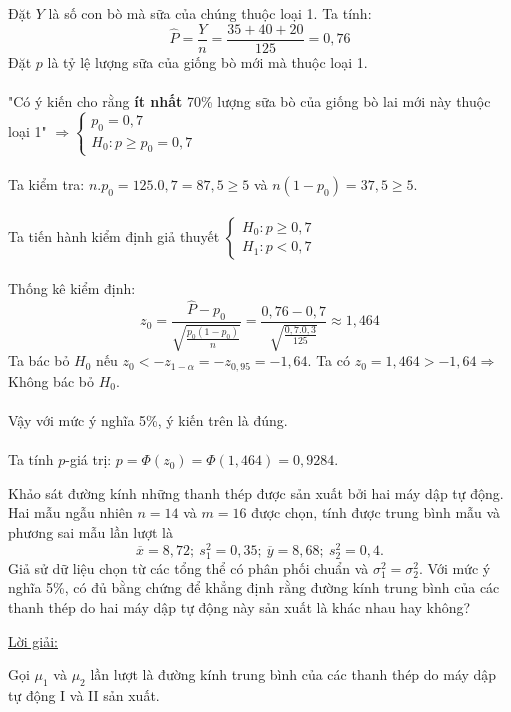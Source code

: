\documentclass[10pt, a4paper]{article}
\begin{document}
Đặt $Y$ là số con bò mà sữa của chúng thuộc loại 1. Ta tính: $$\widehat P=\frac{Y}{n}=\frac{35+40+20}{125}=0,76$$
Đặt $p$ là tỷ lệ lượng sữa của giống bò mới mà thuộc loại 1.\\\\
"Có ý kiến cho rằng \textbf{ít nhất} 70\% lượng sữa bò của giống bò lai mới này thuộc loại 1" $\Rightarrow\begin{cases}
	p_0=0,7\\
	H_0:p\ge p_0=0,7
\end{cases}$\\\\
Ta kiểm tra: $n.p_0=125.0,7=87,5\ge5$ và $n(1-p_0)=37,5\ge5$.\\\\
Ta tiến hành kiểm định giả thuyết $\begin{cases}
	H_0:p\ge0,7\\
	H_1:p<0,7
\end{cases}$\\\\
Thống kê kiểm định: $$z_0=\frac{\widehat P-p_0}{\sqrt{\frac{p_0(1-p_0)}{n}}}=\frac{0,76-0,7}{\sqrt{\frac{0,7.0,3}{125}}}\approx1,464$$
Ta bác bỏ $H_0$ nếu $z_0<-z_{1-\alpha}=-z_{0,95}=-1,64$. Ta có $z_0=1,464>-1,64\Rightarrow$ Không bác bỏ $H_0$.\\\\
Vậy với mức ý nghĩa 5\%, ý kiến trên là đúng.\\\\
Ta tính $p$-giá trị: $p=\Phi(z_0)=\Phi(1,464)=0,9284$.
\vspace{3mm}
\begin{tcolorbox}[enhanced,colback=blue!5!white,colframe=blue!75!black,sharp corners=all,shadow={0mm}{0mm}{-1.5mm}%
{fill=blue!75!red,opacity=0.3},title=\textbf{Bài 2}]
Khảo sát đường kính những thanh thép được sản xuất bởi hai máy dập tự động. Hai mẫu ngẫu nhiên $n=14$ và $m=16$ được chọn, tính được trung bình mẫu và phương sai mẫu lần lượt là $$\overline x=8,72;~s_1^2=0,35;~\overline y=8,68;~s_2^2=0,4.$$ Giả sử dữ liệu chọn từ các tổng thể có phân phối chuẩn và $\sigma_1^2=\sigma_2^2$. Với mức ý nghĩa 5\%, có đủ bằng chứng để khẳng định rằng đường kính trung bình của các thanh thép do hai máy dập tự động này sản xuất là khác nhau hay không?
\end{tcolorbox}
\begin{center}
	\color{blue}\underline{Lời giải:}
\end{center}
Gọi $\mu_1$ và $\mu_2$ lần lượt là đường kính trung bình của các thanh thép do máy dập tự động I và II sản xuất.\\\\
\end{document}
